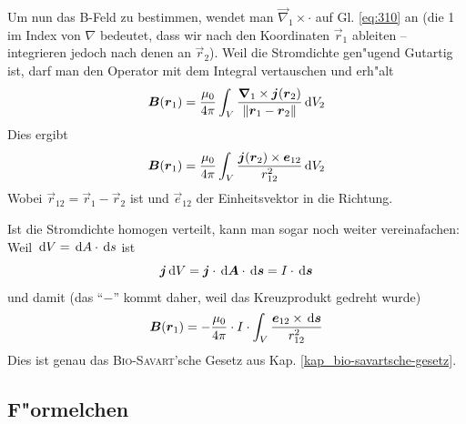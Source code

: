 Um nun das B-Feld zu bestimmen, wendet man $\vec \nabla_1 \times \cdot$ auf
Gl. \eqref{eq:310} an (die 1 im Index von $\nabla$ bedeutet, dass wir
nach den Koordinaten $\vec r_1$ ableiten -- integrieren jedoch nach
denen an $\vec r_2$). Weil die Stromdichte gen"ugend Gutartig ist,
darf man den Operator mit dem Integral vertauschen und erh"alt
\begin{equation}
   \label{eq:311}
   \boldsymbol{B}(\boldsymbol{r}_1) = \frac{\mu_0}{4\pi} \int_{V} \frac{\boldsymbol{\nabla}_1
     \times \boldsymbol{j}(\boldsymbol{r}_2)}{\|\boldsymbol{r}_1 - \boldsymbol{r}_2\|} \, \mathrm{d} V_2
\end{equation}
Dies ergibt
\begin{equation}
   \label{eq:312}
     \boldsymbol{B}(\boldsymbol{r}_1) = \frac{\mu_0}{4\pi} \int_{V} \frac{\boldsymbol{j}(\boldsymbol{r}_2) \times \boldsymbol{e}_{12}}{r_{12}^2} \, \mathrm{d} V_2
\end{equation}
Wobei $\vec r_{12} = \vec r_1 - \vec r_2$ ist und $\vec e_{12}$ der
Einheitsvektor in die Richtung.

Ist die Stromdichte homogen verteilt, kann man sogar noch weiter
vereinafachen: Weil $\, \mathrm{d} V = \, \mathrm{d} A \cdot \, \mathrm{d} s$ ist
\begin{equation*}
   \boldsymbol{j} \, \mathrm{d} V = \boldsymbol{j} \cdot \, \mathrm{d} \boldsymbol{A} \cdot \, \mathrm{d} \boldsymbol{s} = I \cdot
   \, \mathrm{d} \boldsymbol{s}
\end{equation*}
und damit (das "`$-$"' kommt daher, weil das Kreuzprodukt gedreht wurde)
\begin{equation}
   \label{eq:313}
       \boldsymbol{B}(\boldsymbol{r}_1) = - \frac{\mu_0}{4\pi} \cdot I \cdot \int_{V}
       \frac{\boldsymbol{e}_{12} \times \, \mathrm{d} \boldsymbol{s}}{r_{12}^2}
\end{equation}
Dies ist genau das \textsc{Bio-Savart}'sche Gesetz aus
Kap. \ref{kap_bio-savartsche-gesetz}.





\subsection{F"ormelchen}
\label{kap_formelchen}



